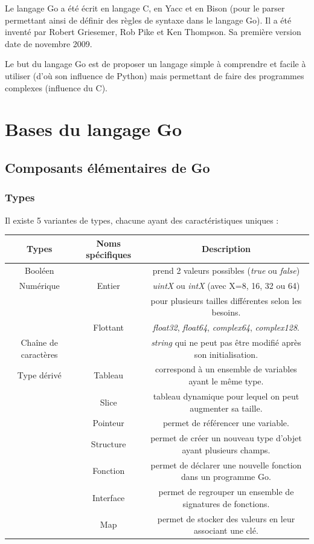 \documentclass[11pt]{article}
\begin{document}
Le langage Go a été écrit en langage C, en Yacc et en Bison (pour le parser permettant ainsi de définir des règles de syntaxe dans le langage Go). Il a été inventé par Robert Griesemer, Rob Pike et Ken Thompson. Sa première version date de novembre 2009. 

Le but du langage Go est de proposer un langage simple à comprendre et facile à utiliser (d'où son influence de Python) mais permettant de faire des programmes complexes (influence du C). 


\section{Bases du langage Go}

\subsection{Composants élémentaires de Go}

\subsubsection{Types}

Il existe 5 variantes de types, chacune ayant des caractéristiques uniques : 

\begin{tabular}[h]{|c|c|c|}
	\hline
	Types & Noms spécifiques & Description \\
	\hline
	Booléen & & prend 2 valeurs possibles (\textit{true} ou \textit{false}) \\
	\hline
	Numérique & Entier & \textit{uintX} ou \textit{intX} (avec X=8, 16, 32 ou 64) \\
	 & & pour plusieurs tailles différentes selon les besoins. \\
	& Flottant &  \textit{float32}, \textit{float64}, \textit{complex64}, \textit{complex128}. \\
	\hline 
	Chaîne de caractères & & \textit{string} qui ne peut pas être modifié après son initialisation. \\
	\hline
	Type dérivé & Tableau & correspond à un ensemble de variables ayant le même type. \\
	 & Slice & tableau dynamique pour lequel on peut augmenter sa taille. \\
	 & Pointeur & permet de référencer une variable. \\
	 & Structure & permet de créer un nouveau type d'objet ayant plusieurs champs. \\
	 & Fonction & permet de déclarer une nouvelle fonction dans un programme Go. \\
	 & Interface & permet de regrouper un ensemble de signatures de fonctions. \\
	 & Map & permet de stocker des valeurs en leur associant une clé. \\
	 \hline 
	
	
\end{tabular}
\end{document}
